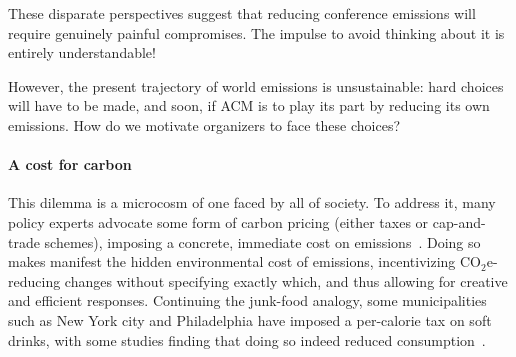 \documentclass[12pt]{article}
\newcommand{\bcp}[1]{\ifdraft{\bf [bcp: #1]}\fi}
\newcommand{\COtwoE}{CO$_2$e}
\newcommand{\PARAGRAPH}{\paragraph*}
\begin{document}
%
These disparate perspectives suggest that reducing conference emissions will
require genuinely painful compromises.  The impulse to avoid thinking about
it is entirely understandable!

However, the present trajectory of world emissions is unsustainable: hard
choices will have to be made, and soon, if ACM is to play its part by
reducing its own emissions. How do we motivate organizers to face these
choices? 

\PARAGRAPH{A cost for carbon}
%
This dilemma is a microcosm of one faced by all of society. To address it,
many policy experts advocate some form of carbon pricing (either taxes or
cap-and-trade schemes), imposing a concrete, immediate cost on
emissions~\cite{carbonprice}. Doing so makes manifest the hidden
environmental cost of emissions, incentivizing
{\COtwoE}-reducing changes without specifying exactly which, and thus
allowing for creative and efficient responses. Continuing the junk-food
analogy, some 
municipalities such as New York city and Philadelphia have imposed a
per-calorie tax on soft drinks, with some studies finding that doing so
indeed reduced consumption~\cite{sodatax}.
\end{document}
